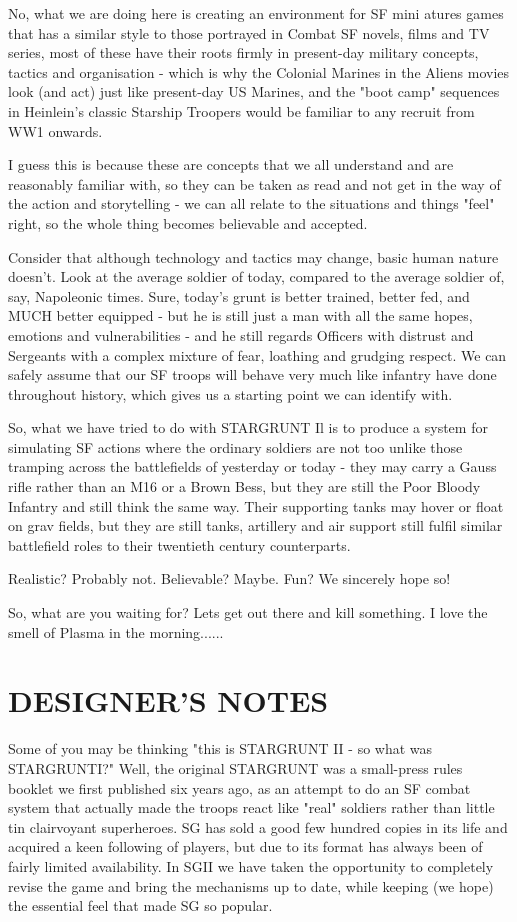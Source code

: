 No, what we are doing here is creating an environment for SF mini atures games that has a similar style to those portrayed in Combat SF novels, films and TV series, most of these have their roots firmly in present-day military concepts, tactics and organisation - which is why the Colonial Marines in the Aliens movies look (and act) just like present-day US Marines, and the "boot camp" sequences in Heinlein's classic Starship Troopers would be familiar to any recruit from WW1 onwards.

I guess this is because these are concepts that we all understand and are reasonably familiar with, so they can be taken as read and not get in the way of the action and storytelling - we can all relate to the situations and things "feel" right, so the whole thing becomes believable and accepted.

Consider that although technology and tactics may change, basic human nature doesn't. Look at the average soldier of today, compared to the average soldier of, say, Napoleonic times. Sure, today's grunt is better trained, better fed, and MUCH better equipped - but he is still just a man with all the same hopes, emotions and vulnerabilities - and he still regards Officers with distrust and Sergeants with a complex mixture of fear, loathing and grudging respect. We can safely assume that our SF troops will behave very much like infantry have done throughout history, which gives us a starting point we can identify with.

So, what we have tried to do with STARGRUNT Il is to produce a system for simulating SF actions where the ordinary soldiers are not too unlike those tramping across the battlefields of yesterday or today - they may carry a Gauss rifle rather than an M16 or a Brown Bess, but they are still the Poor Bloody Infantry and still think the same way. Their supporting tanks may hover or float on grav fields, but they are still tanks, artillery and air support still fulfil similar battlefield roles to their twentieth century counterparts.

Realistic? Probably not. Believable? Maybe. Fun? We sincerely hope so!

So, what are you waiting for? Lets get out there and kill something. I love the smell of Plasma in the morning...... 

\section{DESIGNER'S NOTES}
Some of you may be thinking "this is STARGRUNT II - so what was STARGRUNTI?" Well, the original STARGRUNT was a small-press rules booklet we first published six years ago, as an attempt to do an SF combat system that actually made the troops react like "real" soldiers rather than little tin clairvoyant superheroes. SG has sold a good few hundred copies in its life and acquired a keen following of players, but due to its format has always been of fairly limited availability. In SGII we have taken the opportunity to completely revise the game and bring the mechanisms up to date, while keeping (we hope) the essential feel that made SG so popular.


